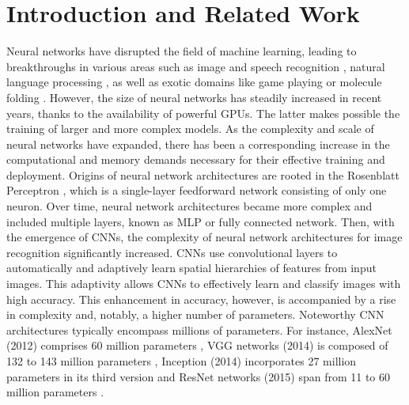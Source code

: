 \section{Introduction and Related Work}
Neural networks have disrupted the field of machine learning, leading to
breakthroughs in various areas such as image and speech recognition
\cite{DBLP:conf/nips/KrizhevskySH12,DBLP:journals/corr/SimonyanZ14a,DBLP:conf/cvpr/HeZRS16,DBLP:journals/corr/HannunCCCDEPSSCN14,DBLP:conf/icassp/ChanJLV16,DBLP:conf/icml/AmodeiABCCCCCCD16},
natural language processing
\cite{DBLP:conf/emnlp/BudzianowskiV19,DBLP:conf/naacl/DevlinCLT19,DBLP:conf/nips/VaswaniSPUJGKP17},
as well as exotic domains like game playing
\cite{silver2016mastering,silver2018general} or molecule folding
\cite{jumper2021highly}. However, the size of neural networks has steadily
increased in recent years, thanks to the availability of powerful \acp{GPU}. The
latter makes possible the training of larger and more complex models. As the
complexity and scale of neural networks have expanded, there has been a
corresponding increase in the computational and memory demands necessary for
their effective training and deployment. Origins of neural network architectures
are rooted in the Rosenblatt Perceptron \cite{rosenblatt1958perceptron}, which
is a single-layer feedforward network consisting of only one neuron. Over time,
neural network architectures became more complex and included multiple layers,
known as \ac{MLP} or fully connected network. Then, with the emergence of
\acp{CNN}, the complexity of neural network architectures for image recognition
significantly increased. \acp{CNN} use convolutional layers to automatically and
adaptively learn spatial hierarchies of features from input images. This
adaptivity allows \acp{CNN} to effectively learn and classify images with high
accuracy. This enhancement in accuracy, however, is accompanied by a rise in
complexity and, notably, a higher number of parameters. Noteworthy \ac{CNN}
architectures typically encompass millions of parameters. For instance, AlexNet
(2012) comprises 60 million parameters \cite{DBLP:conf/nips/KrizhevskySH12}, VGG
networks (2014) is composed of 132 to 143 million parameters
\cite{DBLP:journals/corr/SimonyanZ14a}, Inception (2014) incorporates 27 million
parameters in its third version \cite{DBLP:conf/cvpr/SzegedyLJSRAEVR15} and
ResNet networks (2015) span from 11 to 60 million parameters
\cite{DBLP:conf/cvpr/HeZRS16}.\\

